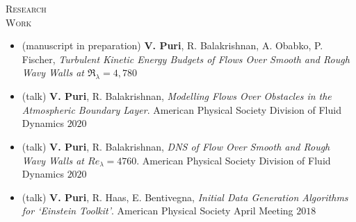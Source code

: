 \documentclass[10pt]{article}
\begin{document}
\begin{multicols}{2}
\textsc{Research \\ Work}
\columnbreak

\vspace{-1.75em}
\begin{itemize}[label= ]
    \setlength{\itemindent}{-2.5em}
    \setlength\itemsep{-0.25em}
    \item (manuscript in preparation) \textbf{V. Puri}, R. Balakrishnan, A. Obabko, P. Fischer, \textit{Turbulent Kinetic Energy Budgets of Flows Over Smooth and Rough Wavy Walls at $\Re_\lambda=4,780$}
    \item (talk) \textbf{V. Puri}, R. Balakrishnan, \textit{Modelling Flows Over Obstacles in the Atmospheric Boundary Layer}. American Physical Society Division of Fluid Dynamics $2020$
    \item (talk) \textbf{V. Puri}, R. Balakrishnan, \textit{DNS of Flow Over Smooth and Rough Wavy Walls at $\mathit{Re}_\lambda=4760$}. American Physical Society Division of Fluid Dynamics $2020$
    \item (talk) \textbf{V. Puri}, R. Haas, E. Bentivegna, \textit{Initial Data Generation Algorithms for `Einstein Toolkit'}. American Physical Society April Meeting $2018$
\end{itemize}
\vspace{-2.0em}

\end{multicols}
\vspace{-1.5em}
\end{document}
